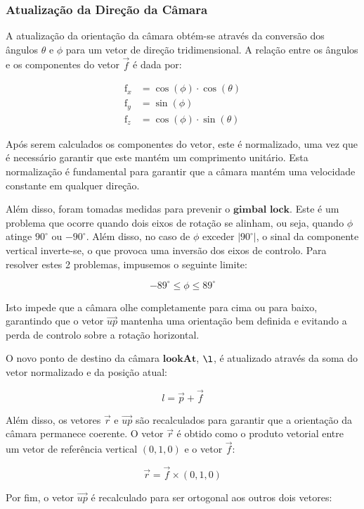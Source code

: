 \documentclass[12pt, a4paper]{article}
\begin{document}
\subsubsection{Atualização da Direção da Câmara}

A atualização da orientação da câmara obtém-se através da conversão dos ângulos $\theta$ e
$\phi$ para um vetor de direção tridimensional. A relação entre os ângulos e os
componentes do vetor $\vec{f}$ é dada por:

\[
\begin{aligned}
    \text{f}_x &= \cos(\phi) \cdot \cos(\theta) \\
    \text{f}_y &= \sin(\phi) \\
    \text{f}_z &= \cos(\phi) \cdot \sin(\theta)
\end{aligned}
\]

Após serem calculados os componentes do vetor, este é normalizado, uma vez que é necessário
garantir que este mantém um comprimento unitário. Esta normalização é fundamental para garantir
que a câmara mantém uma velocidade constante em qualquer direção.

Além disso, foram tomadas medidas para prevenir o $\mathbf{gimbal}$  $\mathbf{lock}$.
Este é um problema que ocorre quando dois eixos de rotação se alinham, ou seja, quando $\phi$
atinge \( 90^\circ \) ou \( -90^\circ \). Além disso, no caso de $\phi$ exceder \( |90^\circ| \),
o sinal da componente vertical inverte-se, o que provoca uma inversão dos eixos de controlo.
Para resolver estes 2 problemas, impusemos o seguinte limite:

$$
-89^\circ \leq \phi \leq 89^\circ
$$

Isto impede que a câmara olhe completamente para cima ou para baixo, garantindo que o vetor
$\vec{up}$ mantenha uma orientação bem definida e evitando a perda de controlo sobre a rotação
horizontal.

O novo ponto de destino da câmara $\mathbf{lookAt}$, $\l$, é atualizado através da soma do vetor
normalizado e da posição atual:

\[
l = \vec{p} + \vec{f}
\]

Além disso, os vetores $\vec{r}$ e $\vec{up}$ são recalculados para garantir que a
orientação da câmara permanece coerente. O vetor $\vec{r}$ é obtido como o produto
vetorial entre um vetor de referência vertical $(0,1,0)$ e o vetor  $\vec{f}$:

\[
    \vec{r} = \vec{f} \times (0,1,0)
\]

Por fim, o vetor $\vec{up}$ é recalculado para ser ortogonal aos outros dois vetores:
\end{document}
